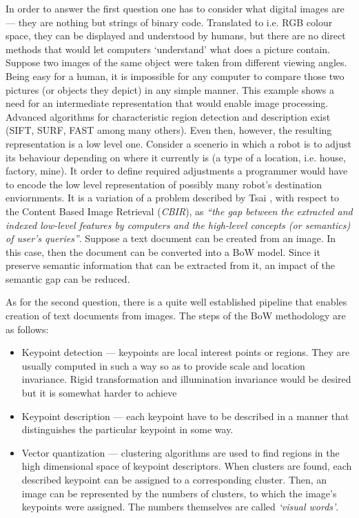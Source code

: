 \documentclass[a4paper,12pt]{article}
\begin{document}
  In order to answer the first question one has to consider what digital images are --- they are nothing but strings of binary code. Translated to i.e. RGB colour space, they can be displayed and understood by humans, but there are no direct methods that would let computers `understand' what does a picture contain. Suppose two images of the same object were taken from different viewing angles. Being easy for a human,  it is impossible for any computer to compare those two pictures (or objects they depict) in any simple manner. This example shows a need for an intermediate representation that would enable image processing. Advanced algorithms for characteristic region detection and description exist (SIFT, SURF, FAST among many others). Even then, however, the resulting representation is a low level one. Consider a scenerio in which a robot is to adjust its behaviour depending on where it currently is (a type of a location, i.e. house, factory, mine). It order to define required adjustments a programmer would have to encode the low level representation of possibly many robot's destination enviornments. It is a variation of a problem described by Tsai \cite{tsai2012bag}, with respect to the Content Based Image Retrieval (\textit{CBIR}), as \emph{``the gap between the extracted and indexed low-level features by computers and the high-level concepts (or semantics) of user’s queries''}. Suppose a text document can be created from an image. In this case, then the document can be converted into a BoW model. Since it preserve semantic information that can be extracted  from it, an impact of the semantic gap can be reduced.
  
  As for the second question, there is a quite well established pipeline that enables creation of text documents from images. The steps of the BoW methodology are as follows:
  \begin{itemize}
   \item Keypoint detection --- keypoints are local interest points or regions. They are usually computed in such a way so as to provide scale and location invariance. Rigid transformation and illumination invariance would be desired but it is somewhat harder to achieve
   \item Keypoint description --- each keypoint have to be described in a manner that distinguishes the particular keypoint in some way.
   \item Vector quantization --- clustering algorithms are used to find regions in the high dimensional space of keypoint descriptors. When clusters are found, each described keypoint can be assigned to a corresponding cluster. Then, an image can be represented by the numbers of clusters, to which the image's keypoints were assigned. The numbers themselves are called \emph{`visual words'}.
  \end{itemize}
  
\end{document}
